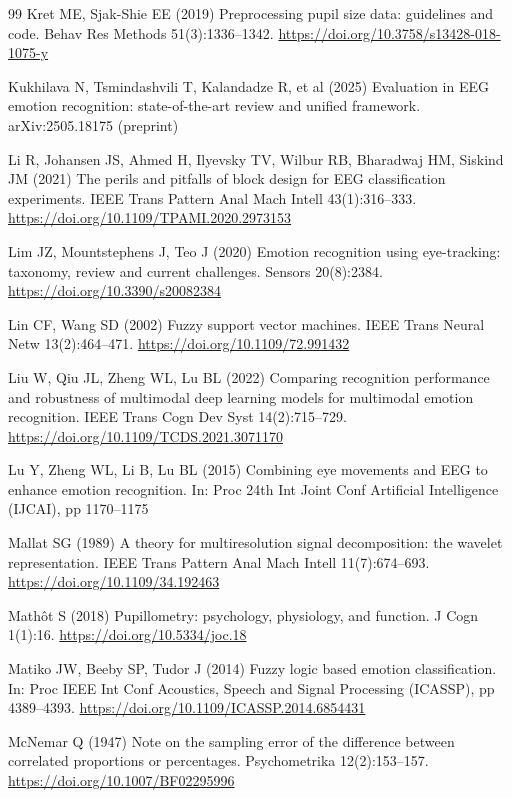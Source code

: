 \begin{thebibliography}{99}
 Kret ME, Sjak-Shie EE (2019) Preprocessing pupil size data: guidelines and code. Behav Res Methods 51(3):1336--1342. \url{https://doi.org/10.3758/s13428-018-1075-y}

 Kukhilava N, Tsmindashvili T, Kalandadze R, et al (2025) Evaluation in EEG emotion recognition: state-of-the-art review and unified framework. arXiv:2505.18175 (preprint)

 Li R, Johansen JS, Ahmed H, Ilyevsky TV, Wilbur RB, Bharadwaj HM, Siskind JM (2021) The perils and pitfalls of block design for EEG classification experiments. IEEE Trans Pattern Anal Mach Intell 43(1):316--333. \url{https://doi.org/10.1109/TPAMI.2020.2973153}

 Lim JZ, Mountstephens J, Teo J (2020) Emotion recognition using eye-tracking: taxonomy, review and current challenges. Sensors 20(8):2384. \url{https://doi.org/10.3390/s20082384}

 Lin CF, Wang SD (2002) Fuzzy support vector machines. IEEE Trans Neural Netw 13(2):464--471. \url{https://doi.org/10.1109/72.991432}

 Liu W, Qiu JL, Zheng WL, Lu BL (2022) Comparing recognition performance and robustness of multimodal deep learning models for multimodal emotion recognition. IEEE Trans Cogn Dev Syst 14(2):715--729. \url{https://doi.org/10.1109/TCDS.2021.3071170}

 Lu Y, Zheng WL, Li B, Lu BL (2015) Combining eye movements and EEG to enhance emotion recognition. In: Proc 24th Int Joint Conf Artificial Intelligence (IJCAI), pp 1170--1175

 Mallat SG (1989) A theory for multiresolution signal decomposition: the wavelet representation. IEEE Trans Pattern Anal Mach Intell 11(7):674--693. \url{https://doi.org/10.1109/34.192463}

 Math\^ot S (2018) Pupillometry: psychology, physiology, and function. J Cogn 1(1):16. \url{https://doi.org/10.5334/joc.18}

 Matiko JW, Beeby SP, Tudor J (2014) Fuzzy logic based emotion classification. In: Proc IEEE Int Conf Acoustics, Speech and Signal Processing (ICASSP), pp 4389--4393. \url{https://doi.org/10.1109/ICASSP.2014.6854431}

 McNemar Q (1947) Note on the sampling error of the difference between correlated proportions or percentages. Psychometrika 12(2):153--157. \url{https://doi.org/10.1007/BF02295996}


\end{thebibliography}
